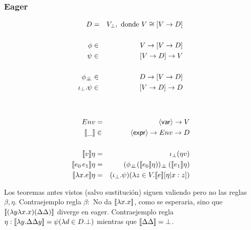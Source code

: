     \subsubsection{Eager}
      \begin{multicols}{2}
        \begin{eqnarray*}
          D &=& V_\bot, \text{ donde } V \cong [V \to D] \\ \\
          \phi &\in& V \to [V \to D] \\
          \psi &\in& [V \to D] \to V \\ \\
          \phi_{\bot\!\!\!\bot} &\in& D \to [V \to D] \\
          \iota_\bot . \psi &\in& [V \to D] \to D
        \end{eqnarray*}
        \begin{eqnarray*}
          \\ \\
          Env &=& \langle \mathsf{var} \rangle \to V \\
          \llbracket\_\rrbracket &\in& \langle \mathsf{expr} \rangle \to Env \to D \\ \\
          \llbracket v\rrbracket\eta &=& \iota_\bot (\eta v) \\
          \llbracket e_0\, e_1\rrbracket\eta &=& (\phi_{\bot\!\!\!\bot} (\llbracket e_0\rrbracket\eta))_{\bot\!\!\!\bot}\, (\llbracket e_1\rrbracket\eta)\\
          \llbracket\lambda x.e\rrbracket\eta &=& (\iota_\bot . \psi)(\lambda z \in V. \llbracket e\rrbracket[\eta|x:z])
        \end{eqnarray*}
      \end{multicols}
      \PN Los teoremas antes vistos (salvo sustitución) siguen valiendo pero no las reglas $\beta, \eta$.
      \PN Contraejemplo regla $\beta:$ No da $[\![\lambda x. x]\!]$, como se esperaria, sino que $[\![(\lambda y \lambda x.x)(\Delta \Delta)]\!]$ diverge en eager.
      \PN Contraejemplo regla $\eta: [\![\lambda y. \Delta\Delta y]\!] = \psi(\lambda d \in D.\bot)$ mientras que $[\![\Delta\Delta]\!] = \bot$.